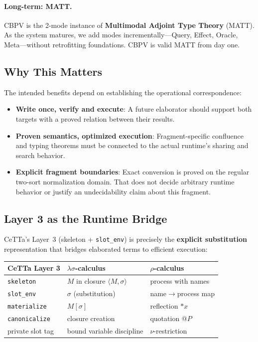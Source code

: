 \documentclass[11pt]{article}
\newcommand{\code}[1]{\texttt{#1}}
\newcommand{\CeTTa}{\textup{CeTTa}}
\begin{document}
\paragraph{Long-term: MATT.}
CBPV is the 2-mode instance of \textbf{Multimodal Adjoint Type Theory}
(MATT).  As the system matures, we add modes incrementally---Query,
Effect, Oracle, Meta---without retrofitting foundations.  CBPV is
valid MATT from day one.

\subsection{Why This Matters}

The intended benefits depend on establishing the operational correspondence:

\begin{itemize}
\item \textbf{Write once, verify and execute}: A future elaborator should
  support both targets with a proved relation between their results.
\item \textbf{Proven semantics, optimized execution}: Fragment-specific
  confluence and typing theorems must be connected to the actual runtime's
  sharing and search behavior.
\item \textbf{Explicit fragment boundaries}: Exact conversion is proved on
  the regular two-sort normalization domain. That does not decide arbitrary
  runtime behavior or justify an undecidability claim about this fragment.
\end{itemize}

\subsection{Layer 3 as the Runtime Bridge}

\CeTTa{}'s Layer~3 (skeleton + \code{slot\_env}) is precisely the
\textbf{explicit substitution} representation that bridges elaborated
terms to efficient execution:

\begin{center}
\begin{tabular}{lll}
\toprule
\textbf{CeTTa Layer 3} & \textbf{$\lambda\sigma$-calculus} & \textbf{$\rho$-calculus} \\
\midrule
\code{skeleton} & $M$ in closure $\langle M, \sigma \rangle$ & process with names \\
\code{slot\_env} & $\sigma$ (substitution) & name$\to$process map \\
\code{materialize} & $M[\sigma]$ & reflection $*x$ \\
\code{canonicalize} & closure creation & quotation $@P$ \\
private slot tag & bound variable discipline & $\nu$-restriction \\
\bottomrule
\end{tabular}
\end{center}
\end{document}

